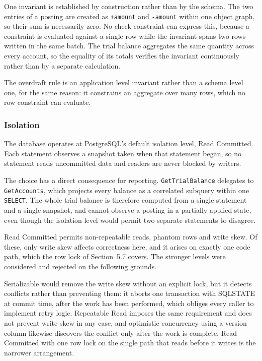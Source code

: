 \documentclass[11pt,a4paper]{article}
\newcommand{\code}[1]{\texttt{\fontsize{8.6}{10}\selectfont #1}}
\begin{document}
One invariant is established by construction rather than by the schema. The two
entries of a posting are created as \code{+amount} and \code{-amount} within one
object graph, so their sum is necessarily zero. No check constraint can express
this, because a constraint is evaluated against a single row while the invariant
spans two rows written in the same batch. The trial balance aggregates the same
quantity across every account, so the equality of its totals verifies the
invariant continuously rather than by a separate calculation.

The overdraft rule is an application level invariant rather than a schema level
one, for the same reason: it constrains an aggregate over many rows, which no
row constraint can evaluate.

\subsubsection*{Isolation}

The database operates at PostgreSQL's default isolation level, Read Committed.
Each statement observes a snapshot taken when that statement began, so no
statement reads uncommitted data and readers are never blocked by writers.

The choice has a direct consequence for reporting. \code{GetTrialBalance}
delegates to \code{GetAccounts}, which projects every balance as a correlated
subquery within one \code{SELECT}. The whole trial balance is therefore computed
from a single statement and a single snapshot, and cannot observe a posting in a
partially applied state, even though the isolation level would permit two
separate statements to disagree.

Read Committed permits non-repeatable reads, phantom rows and write skew.
Of these, only write skew affects correctness here, and it arises on exactly one
code path, which the row lock of Section~5.7 covers. The stronger levels were
considered and rejected on the following grounds.

Serializable would remove the write skew without an explicit lock, but it
detects conflicts rather than preventing them: it aborts one transaction with
SQLSTATE \code{40001} at commit time, after the work has been performed, which
obliges every caller to implement retry logic. Repeatable Read imposes the same
requirement and does not prevent write skew in any case, and optimistic
concurrency using a version column likewise discovers the conflict only after
the work is complete. Read Committed with one row lock on the single path that
reads before it writes is the narrower arrangement.
\end{document}
